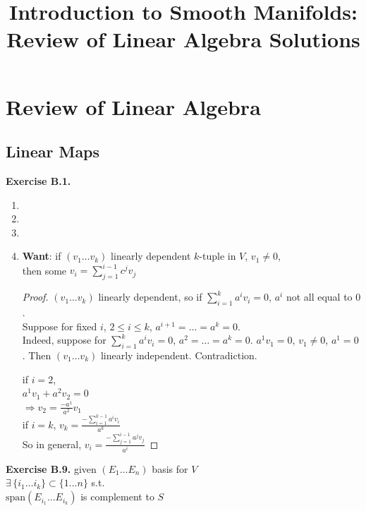 \documentclass[11pt]{amsart}
\title{Introduction to Smooth Manifolds: Review of Linear Algebra Solutions}
\theoremstyle{definition}
\newcommand{\exercisehead}[1]{\medskip\noindent\textbf{Exercise #1.} }
\begin{document}
\maketitle
\section{Review of Linear Algebra }

\subsection{Linear Maps}

\exercisehead{B.1}
\begin{enumerate}
  \item[(a)]
\item[(b)]
\item[(c)]
\item[(d)] \textbf{Want}: if $(v_1 \dots v_k)$ linearly dependent $k$-tuple in $V$, $v_1 \neq 0$, \\
then some $v_i = \sum_{j=1}^{i-1} c^j v_j$ \\
\begin{proof}
$(v_1 \dots v_k)$ linearly dependent, so if $\sum_{i=1}^k a^i v_i = 0$, $a^i$ not all equal to $0$.  \\

Suppose for fixed $i$, $2\leq i \leq k$, $a^{i+1} = \dots =a^k=0$. \\
\quad Indeed, suppose for $\sum_{i=1}^k a^i v_i = 0$, $a^2 = \dots = a^k = 0$.  $a^1 v_1 =0$, $v_1 \neq 0$, $a^1 =0$.  Then $(v_1 \dots v_k)$ linearly independent.  Contradiction.

if $i=2$, \\
\phantom{\quad} $a^1 v_1 + a^2 v_2 =0$ \\
\phantom{\quad \,} $\Longrightarrow v_2  = \frac{-a^1}{a^2} v_1$ \\

if $i=k$, $v_k = \frac{ -\sum_{i=1}^{k-1} a^i v_i }{ a^k}$  \\

So in general, $v_i = \frac{ -\sum_{j=1}^{i-1} a^j v_j }{ a^i}$
\end{proof}
\end{enumerate}

\exercisehead{B.9}
given $(E_1 \dots E_n)$ basis for $V$ \\
\phantom{ \quad } $\exists \, \lbrace i_1 \dots i_k \rbrace \subset \lbrace 1 \dots n \rbrace$ s.t. \\
\phantom{ \quad \, } $ \text{span}(E_{i_1} \dots E_{i_k} )$ is complement to $S$ \\
\end{document}
